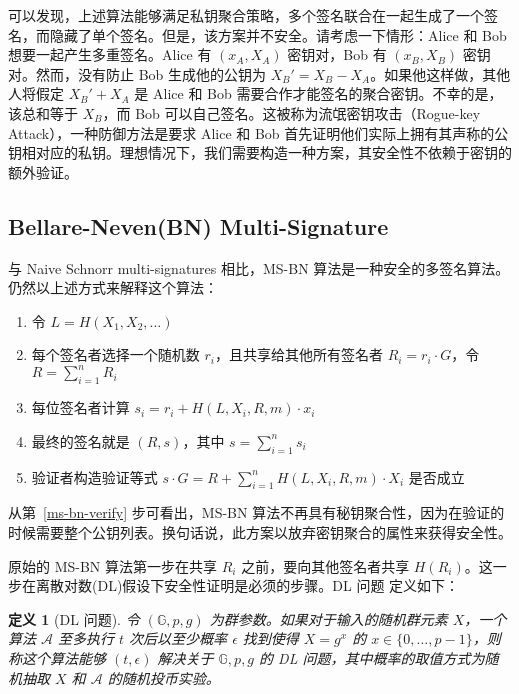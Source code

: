 \documentclass[a4paper,10pt]{article}
\newtheorem{definition}{\bf 定义}[section]
\begin{document}
可以发现，上述算法能够满足私钥聚合策略，多个签名联合在一起生成了一个签名，而隐藏了单个签名。但是，该方案并不安全。请考虑一下情形：Alice 和 Bob 想要一起产生多重签名。Alice 有
\((x_A,X_A)\) 密钥对，Bob 有 \((x_B,X_B)\) 密钥对。然而，没有防止 Bob 生成他的公钥为 \(X_B'=X_B-X_A\)。如果他这样做，其他人将假定
\(X_B'+X_A\) 是 Alice 和 Bob 需要合作才能签名的聚合密钥。不幸的是，该总和等于 \(X_B\)，而 Bob 可以自己签名。这被称为流氓密钥攻击（Rogue-key
Attack），一种防御方法是要求 Alice 和 Bob 首先证明他们实际上拥有其声称的公钥相对应的私钥。理想情况下，我们需要构造一种方案，其安全性不依赖于密钥的额外验证。

\subsection{Bellare-Neven(BN) Multi-Signature}

与 Naive Schnorr multi-signatures 相比，MS-BN \cite{2006Multi} 算法是一种安全的多签名算法。仍然以上述方式来解释这个算法：

\begin{enumerate}
  \item 令 \(L=H(X_1,X_2,\dots)\)
  \item 每个签名者选择一个随机数 \(r_i\)，且共享给其他所有签名者 \(R_i=r_i\cdot G\)，令 \(R=\sum_{i=1}^n R_i\)
  \item 每位签名者计算 \(s_i=r_i+H(L,X_i,R,m)\cdot x_i\)
  \item 最终的签名就是 \((R,s)\)，其中 \(s=\sum_{i=1}^n s_i\)
  \item\label{ms-bn-verify} 验证者构造验证等式 \(s\cdot G=R+\sum_{i=1}^n H(L,X_i,R,m)\cdot X_i\) 是否成立
\end{enumerate}

从第~\ref{ms-bn-verify} 步可看出，MS-BN 算法不再具有秘钥聚合性，因为在验证的时候需要整个公钥列表。换句话说，此方案以放弃密钥聚合的属性来获得安全性。

原始的 MS-BN 算法第一步在共享 \(R_i\) 之前，要向其他签名者共享 \(H(R_i)\)。这一步在离散对数(DL)假设下安全性证明是必须的步骤。DL 问题 \cite{2019Simple} 定义如下：

\begin{definition}[DL 问题]
  令 \((\mathbb{G},p,g)\) 为群参数。如果对于输入的随机群元素 \(X\)，一个算法 \(\mathcal{A}\) 至多执行 \(t\) 次后以至少概率
  \(\epsilon\) 找到使得 \(X=g^x\) 的 \(x\in\{0,\dots,p-1\}\)，则称这个算法能够 \((t,\epsilon)\) 解决关于
  \(\mathbb{G},p,g\) 的 DL 问题，其中概率的取值方式为随机抽取 \(X\) 和 \(\mathcal{A}\) 的随机投币实验。
\end{definition}
\end{document}
